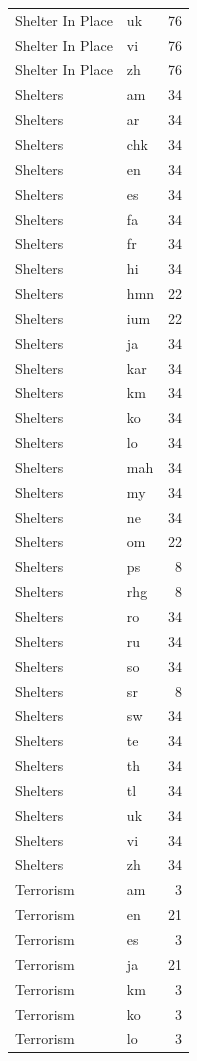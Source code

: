 \begin{longtable}{p{3cm} p{3cm} r}
Shelter In Place & uk & 76 \\
Shelter In Place & vi & 76 \\
Shelter In Place & zh & 76 \\
Shelters & am & 34 \\
Shelters & ar & 34 \\
Shelters & chk & 34 \\
Shelters & en & 34 \\
Shelters & es & 34 \\
Shelters & fa & 34 \\
Shelters & fr & 34 \\
Shelters & hi & 34 \\
Shelters & hmn & 22 \\
Shelters & ium & 22 \\
Shelters & ja & 34 \\
Shelters & kar & 34 \\
Shelters & km & 34 \\
Shelters & ko & 34 \\
Shelters & lo & 34 \\
Shelters & mah & 34 \\
Shelters & my & 34 \\
Shelters & ne & 34 \\
Shelters & om & 22 \\
Shelters & ps & 8 \\
Shelters & rhg & 8 \\
Shelters & ro & 34 \\
Shelters & ru & 34 \\
Shelters & so & 34 \\
Shelters & sr & 8 \\
Shelters & sw & 34 \\
Shelters & te & 34 \\
Shelters & th & 34 \\
Shelters & tl & 34 \\
Shelters & uk & 34 \\
Shelters & vi & 34 \\
Shelters & zh & 34 \\
Terrorism & am & 3 \\
Terrorism & en & 21 \\
Terrorism & es & 3 \\
Terrorism & ja & 21 \\
Terrorism & km & 3 \\
Terrorism & ko & 3 \\
Terrorism & lo & 3 \\

\end{longtable}
